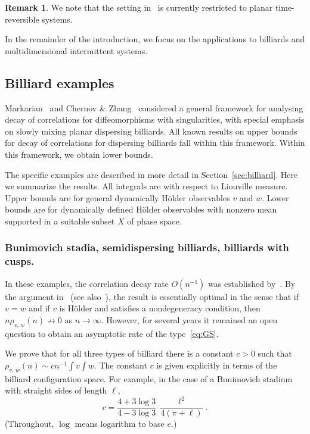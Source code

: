 \documentclass[10pt]{amsart}
\theoremstyle{definition}\newtheorem{defi}[theo]{Definition}\newtheorem{rema}[theo]{Remark}\newtheorem{exam}[theo]{Example}\newtheorem{exem}[theo]{Example}\newtheorem{nota}[theo]{Notation}
\begin{document}
\begin{rema}
We note that the setting in~\cite{VaientiZhangsub} is currently restricted to planar time-reversible systems.
\end{rema}


In the remainder of the introduction, we focus on the applications to billiards and multidimensional intermittent systems.



\subsection{Billiard examples}\label{sec:introbill}

Markarian~\cite{Markarian04} and Chernov \& Zhang~\cite{ChernovZhang05} considered a general framework for analysing decay of correlations for diffeomorphisms with singularities, with special emphasis on slowly mixing planar dispersing billiards. All known results on upper bounds for decay of correlations for dispersing billiards fall within this framework. Within this framework, we obtain lower bounds.

The specific examples are described in more detail in Section~\ref{sec:billiard}. Here we summarize the results. All integrals are with respect to Liouville measure. Upper bounds are for general dynamically H\"older observables $v$ and $w$. Lower bounds are for dynamically defined H\"older observables with nonzero mean supported in a suitable subset $X$ of phase space.


\subsubsection*{Bunimovich stadia, semidispersing billiards, billiards with cusps.}
In these examples, the correlation decay rate $O(n^{-1})$ was established by~\cite{ChernovMarkarian07,ChernovZhang05,ChernovZhang08,Markarian04}. By the argument in~\cite[Corollary~1.3]{BalintGouezel06} (see also~\cite[Corollary~1.1]{BalintChernovDolgopyat11}), the result is essentially optimal in the sense that if $v=w$ and if $v$ is H\"older and satisfies a nondegeneracy condition, then $n\rho_{v,\,w}(n)\not\to0$ as $n\to\infty$. However, for several years it remained an open question to obtain an asymptotic rate of the type~\eqref{eq:GS}.

We prove that for all three types of billiard there is a constant $c>0$ such that $\rho_{v,\,w}(n)\sim cn^{-1}\int v\int w$. The constant $c$ is given explicitly in terms of the billiard configuration space. For example, in the case of a Bunimovich stadium with straight sides of length $\ell$,
\[
c= \frac{4+3\log 3}{4-3\log 3}\,\frac{\ell^2}{4(\pi+\ell)}.
\]
(Throughout, $\log$ means logarithm to base $e$.)
\end{document}
